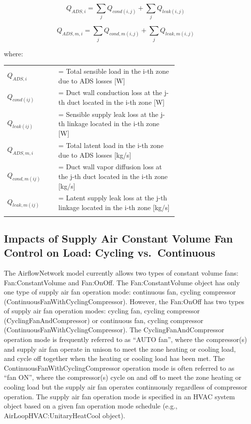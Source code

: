\begin{equation}
Q_{ADS,i} = \sum_{j} Q_{cond(i,j)} + \sum_{j} Q_{leak(i,j)}
\end{equation}

\begin{equation}
Q_{ADS,m,i} = \sum_{j} Q_{cond,m(i,j)} + \sum_{j} Q_{leak,m(i,j)}
\end{equation}

where:

\begin{tabular}{lp{0.7\linewidth}}
\\
$Q_{ADS,i}$ &= Total sensible load in the i-th zone due to ADS losses [W]\\
$Q_{cond(ij)}$ &= Duct wall conduction loss at the j-th duct located in the i-th zone [W]\\
$Q_{leak(ij)}$ &= Sensible supply leak loss at the j-th linkage located in the i-th zone [W]\\
$Q_{ADS,m,i}$ &= Total latent load in the i-th zone due to ADS losses [kg/s]\\
$Q_{cond,m(ij)}$ &= Duct wall vapor diffusion loss at the j-th duct located in the i-th zone [kg/s]\\
$Q_{leak,m(ij)}$ &= Latent supply leak loss at the j-th linkage located in the i-th zone [kg/s]\\
\\
\end{tabular}

\subsection{Impacts of Supply Air Constant Volume Fan Control on Load: Cycling vs.~Continuous}\label{impacts-of-supply-air-constant-volume-fan-control-on-load-cycling-vs.continuous}

The AirflowNetwork model currently allows two types of constant volume fans: Fan:ConstantVolume and Fan:OnOff. The Fan:ConstantVolume object has only one type of supply air fan operation mode: continuous fan, cycling compressor (ContinuousFanWithCyclingCompressor). However, the Fan:OnOff has two types of supply air fan operation modes: cycling fan, cycling compressor (CyclingFanAndCompressor) or continuous fan, cycling compressor (ContinuousFanWithCyclingCompressor). The CyclingFanAndCompressor operation mode is frequently referred to as ``AUTO fan'', where the compressor(s) and supply air fan operate in unison to meet the zone heating or cooling load, and cycle off together when the heating or cooling load has been met. The ContinuousFanWithCyclingCompressor operation mode is often referred to as ``fan ON'', where the compressor(s) cycle on and off to meet the zone heating or cooling load but the supply air fan operates continuously regardless of compressor operation. The supply air fan operation mode is specified in an HVAC system object based on a given fan operation mode schedule (e.g., AirLoopHVAC:UnitaryHeatCool object).


